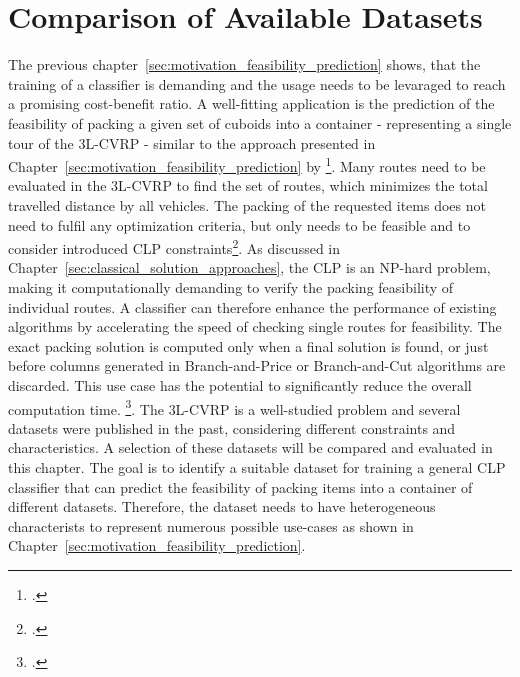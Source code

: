 \chapter{Comparison of Available Datasets}
\label{sec:dataset_selection}

The previous chapter~\ref{sec:motivation_feasibility_prediction} shows, that
the training of a classifier is demanding and the usage needs to be levaraged to reach a promising
cost-benefit ratio. A well-fitting application is the prediction of the feasibility of
packing a given set of cuboids into a container - representing a single tour of the \gls{3L-CVRP} - similar to the approach
presented in Chapter~\ref{sec:motivation_feasibility_prediction} by \citeauthor*{zhang_learning-based_2022}\footcite[cf.][]{zhang_learning-based_2022}.
Many routes need to be evaluated in the \gls{3L-CVRP} to find the set of routes, which minimizes the
total travelled distance by all vehicles. The packing of the requested items does not need to
fulfil any optimization criteria, but only needs to be feasible and to consider introduced \gls{CLP} constraints\footcite[cf.][]{tamke_branch-and-cut_2024}.
As discussed in Chapter~\ref{sec:classical_solution_approaches}, the \gls{CLP} is an NP-hard problem,
making it computationally demanding to verify the packing feasibility of individual routes.
A classifier can therefore enhance the performance of existing algorithms by accelerating the speed
of checking single routes for feasibility. The exact packing solution is computed only when a final
solution is found, or just before columns generated in Branch-and-Price or Branch-and-Cut algorithms
are discarded. This use case has the potential to significantly reduce the overall computation time. \footcite[cf.][pp. 9--11]{zhang_learning-based_2022}.
The \gls{3L-CVRP} is a well-studied problem and several datasets were published in the past, considering
different constraints and characteristics. A selection of these datasets will be compared and evaluated
in this chapter. The goal is to identify a suitable dataset for training a general \gls{CLP} classifier that can predict
the feasibility of packing items into a container of different datasets. Therefore, the dataset needs
to have heterogeneous characterists to represent numerous possible use-cases
as shown in Chapter~\ref{sec:motivation_feasibility_prediction}.

\parbreak

